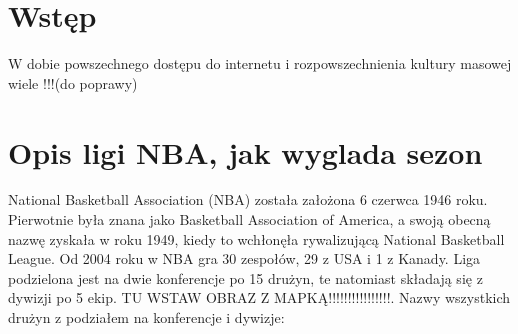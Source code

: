\documentclass[inzynierska]{pwr_wmat_praca_dyplomowa}
\theoremstyle{plain}
\numberwithin{theorem}{chapter}
\theoremstyle{definition}
\numberwithin{theorem}{chapter}
\begin{document}
\frontmatter
\maketitle
\mainmatter
\tableofcontents

{\backmatter \chapter{Wstęp}}
W dobie powszechnego dostępu do internetu i rozpowszechnienia kultury masowej wiele !!!(do poprawy)

\chapter{Opis ligi NBA, jak wyglada sezon}
National Basketball Association (NBA) została założona 6 czerwca 1946 roku. Pierwotnie była znana jako Basketball Association of America, a swoją obecną nazwę zyskała w roku 1949, kiedy to wchłonęła rywalizującą National Basketball League. Od 2004 roku w NBA gra 30 zespołów, 29 z USA i 1 z Kanady. Liga podzielona jest na dwie konferencje po 15 drużyn, te natomiast składają się z dywizji po 5 ekip. TU WSTAW OBRAZ Z MAPKĄ!!!!!!!!!!!!!!!!. Nazwy wszystkich drużyn z podziałem na konferencje i dywizje:
\end{document}
